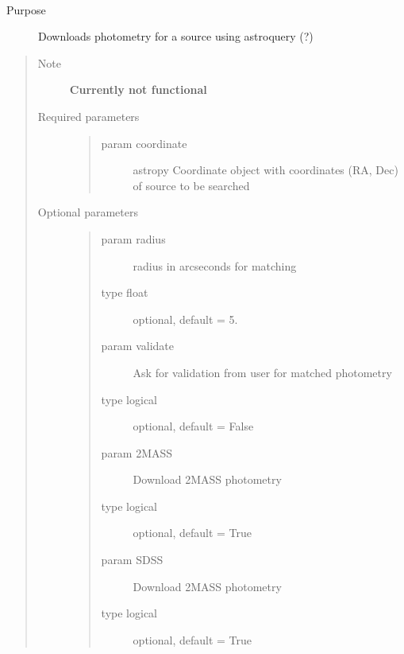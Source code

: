 \documentclass[letterpaper,10pt,english]{sphinxmanual}
\begin{document}

\begin{fulllineitems}
\label{api:splat_db.getPhotometry}~\begin{description}
\item[{Purpose}] \leavevmode
Downloads photometry for a source using astroquery (?)

\end{description}
\begin{quote}\begin{description}
\item[{Note}] \leavevmode
\textbf{Currently not functional}

\item[{Required parameters}] \leavevmode\begin{quote}\begin{description}
\item[{param coordinate}] \leavevmode
astropy Coordinate object with coordinates (RA, Dec) of source to be searched

\end{description}\end{quote}

\item[{Optional parameters}] \leavevmode\begin{quote}\begin{description}
\item[{param radius}] \leavevmode
radius in arcseconds for matching

\item[{type float}] \leavevmode
optional, default = 5.

\item[{param validate}] \leavevmode
Ask for validation from user for matched photometry

\item[{type logical}] \leavevmode
optional, default = False

\item[{param 2MASS}] \leavevmode
Download 2MASS photometry

\item[{type logical}] \leavevmode
optional, default = True

\item[{param SDSS}] \leavevmode
Download 2MASS photometry

\item[{type logical}] \leavevmode
optional, default = True


\end{description}
\end{quote}
\end{description}
\end{quote}
\end{fulllineitems}
\end{document}
